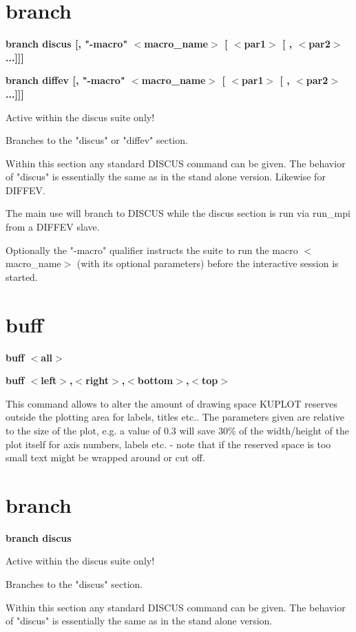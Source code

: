 \section{branch}
{\bf branch discus [, "-macro" $ <$macro\_name$> $ [ $ <$par1$> $ [ , $ <$par2$> $ ...]]] \par }
{\bf branch diffev [, "-macro" $ <$macro\_name$> $ [ $ <$par1$> $ [ , $ <$par2$> $ ...]]] \par }
\par
\vspace{3pt}
Active within the discus suite only! 
\par
Branches to the "discus" or "diffev" section. 
\par
Within this section any standard DISCUS command can be 
given. The behavior of "discus" is essentially the same 
as in the stand alone version. Likewise for DIFFEV. 
\par
The main use will branch to DISCUS while the discus section 
is run via run\_mpi from a DIFFEV slave. 
\par
Optionally the "-macro" qualifier instructs the suite to run the 
macro $ <$macro\_name$> $ (with its optional parameters) before the 
interactive session is started. 
\section{buff}
{\bf buff $ <$all$> $ \par }
{\bf buff $ <$left$> $,$ <$right$> $,$ <$bottom$> $,$ <$top$> $ \par }
\par
\vspace{3pt}
This command allows to alter the amount of drawing space KUPLOT 
reserves outside the plotting area for labels, titles etc.. The 
parameters given are relative to the size of the plot, e.g. a 
value of 0.3 will save 30\% of the width/height of the plot itself 
for axis numbers, labels etc. - note that if the reserved space 
is too small text might be wrapped around or cut off. 
\section{branch}
{\bf branch discus \par }
\par
\vspace{3pt}
Active within the discus suite only! 
\par
Branches to the "discus" section. 
\par
Within this section any standard DISCUS command can be 
given. The behavior of "discus" is essentially the same 
as in the stand alone version. 
